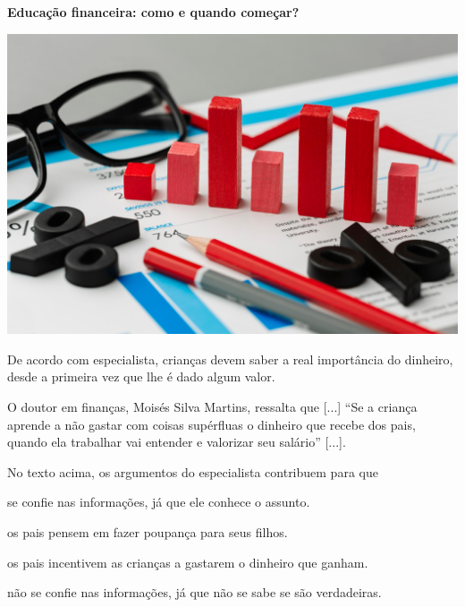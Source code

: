 \begin{myquote}
\textbf{Educação financeira: como e quando começar?}

\begin{center}
\includegraphics[width=\textwidth]{./media/image23p.jpg}
\end{center}

De acordo com especialista, crianças devem saber a real importância do
dinheiro, desde a primeira vez que lhe é dado algum valor.

O doutor em finanças, Moisés Silva Martins, ressalta que {[}...{]} ``Se
a criança aprende a não gastar com coisas supérfluas o dinheiro que
recebe dos pais, quando ela trabalhar vai entender e valorizar seu
salário'' {[}...{]}.

\end{myquote}

No texto acima, os argumentos do especialista contribuem para que

\begin{escolha}
\item se confie nas informações, já que ele conhece o assunto.

\item os pais pensem em fazer poupança para seus filhos.

\item os pais incentivem as crianças a gastarem o dinheiro que ganham.

\item não se confie nas informações, já que não se sabe se são verdadeiras.
\end{escolha}

